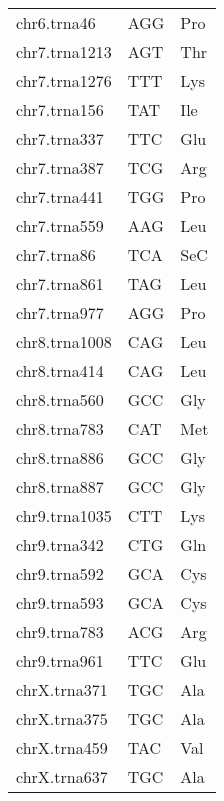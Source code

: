 \begin{longtable}{@{}l>{\collectcell\anticodon}l<{\endcollectcell}l@{}}
    chr6.trna46 & AGG & Pro \\
    chr7.trna1213 & AGT & Thr \\
    chr7.trna1276 & TTT & Lys \\
    chr7.trna156 & TAT & Ile \\
    chr7.trna337 & TTC & Glu \\
    chr7.trna387 & TCG & Arg \\
    chr7.trna441 & TGG & Pro \\
    chr7.trna559 & AAG & Leu \\
    chr7.trna86 & TCA & SeC \\
    chr7.trna861 & TAG & Leu \\
    chr7.trna977 & AGG & Pro \\
    chr8.trna1008 & CAG & Leu \\
    chr8.trna414 & CAG & Leu \\
    chr8.trna560 & GCC & Gly \\
    chr8.trna783 & CAT & Met \\
    chr8.trna886 & GCC & Gly \\
    chr8.trna887 & GCC & Gly \\
    chr9.trna1035 & CTT & Lys \\
    chr9.trna342 & CTG & Gln \\
    chr9.trna592 & GCA & Cys \\
    chr9.trna593 & GCA & Cys \\
    chr9.trna783 & ACG & Arg \\
    chr9.trna961 & TTC & Glu \\
    chrX.trna371 & TGC & Ala \\
    chrX.trna375 & TGC & Ala \\
    chrX.trna459 & TAC & Val \\
    chrX.trna637 & TGC & Ala \\
    \bottomrule
\end{longtable}
